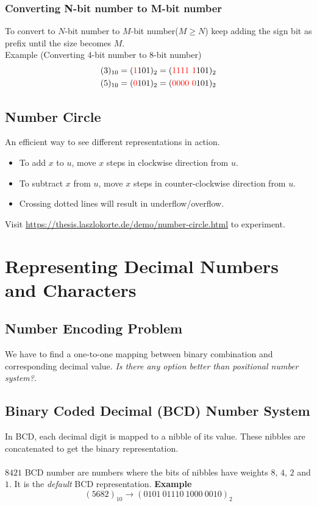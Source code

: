 \documentclass[oneside]{book}
\begin{document}
\subsubsection{Converting N-bit number to M-bit number}
To convert to \(N\)-bit number to \(M\)-bit number(\(M\geq N\)) keep adding the sign bit as prefix until the size becomes \(M\).
\\
Example (Converting 4-bit number to 8-bit number)
\begin{align*}
	(3)_{10} = (\textcolor{red}{1}101)_2 = (\textcolor{red}{1111\ 1}101)_2 \\
	(5)_{10} = (\textcolor{red}{0}101)_2 = (\textcolor{red}{0000\ 0}101)_2
\end{align*}

\subsection{Number Circle}
An efficient way to see different representations in action.
\begin{itemize}
	\item To add \(x\) to \(u\), move \(x\) steps in clockwise direction from \(u\).
	\item To subtract \(x\) from \(u\), move \(x\) steps in counter-clockwise direction from \(u\).
	\item Crossing dotted lines will result in underflow/overflow.
\end{itemize}
Visit \url{https://thesis.laszlokorte.de/demo/number-circle.html} to experiment.

\section{Representing Decimal Numbers and Characters}
\subsection{Number Encoding Problem}
We have to find a one-to-one mapping between binary combination and corresponding decimal value. \textit{Is there any option better than positional number system?}.
\subsection{Binary Coded Decimal (BCD) Number System}
In BCD, each decimal digit is mapped to a nibble of its value. These nibbles are concatenated to get the binary representation.
\\\\
\noindent \(8421\) BCD number are numbers where the bits of nibbles have weights \(8\), \(4\), \(2\) and \(1\). It is the \textit{default} BCD representation.
\textbf{Example}
\[
	(5682)_{10} \longrightarrow (0101\ 01110\ 1000\ 0010)_2
\]
\end{document}
